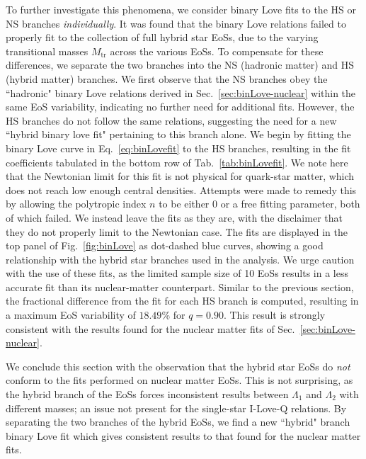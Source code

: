 \documentclass[prd,twocolumn,nofootinbib,superscriptaddress,amsmath,amssymb]{revtex4-1}
\begin{document}
To further investigate this phenomena, we consider binary Love fits to the HS or NS branches \emph{individually}.
It was found that the binary Love relations failed to properly fit to the collection of full hybrid star EoSs, due to the varying transitional masses $M_{\text{tr}}$ across the various EoSs.
To compensate for these differences, we separate the two branches into the NS (hadronic matter) and HS (hybrid matter) branches.
We first observe that the NS branches obey the ``hadronic" binary Love relations derived in Sec.~\ref{sec:binLove-nuclear} within the same EoS variability, indicating no further need for additional fits.
However, the HS branches do not follow the same relations, suggesting the need for a new ``hybrid binary love fit" pertaining to this branch alone.
We begin by fitting the binary Love curve in Eq.~\ref{eq:binLovefit} to the HS branches, resulting in the fit coefficients tabulated in the bottom row of Tab.~\ref{tab:binLovefit}.
We note here that the Newtonian limit for this fit is not physical for quark-star matter, which does not reach low enough central densities.
Attempts were made to remedy this by allowing the polytropic index $n$ to be either $0$ or a free fitting parameter, both of which failed.
We instead leave the fits as they are, with the disclaimer that they do not properly limit to the Newtonian case.
The fits are displayed in the top panel of Fig.~\ref{fig:binLove} as dot-dashed blue curves, showing a good relationship with the hybrid star branches used in the analysis.
We urge caution with the use of these fits, as the limited sample size of 10 EoSs results in a less accurate fit than its nuclear-matter counterpart.
Similar to the previous section, the fractional difference from the fit for each HS branch is computed, resulting in a maximum EoS variability of $18.49$\% for $q=0.90$.
This result is strongly consistent with the results found for the nuclear matter fits of Sec.~\ref{sec:binLove-nuclear}.

We conclude this section with the observation that the hybrid star EoSs do \emph{not} conform to the fits performed on nuclear matter EoSs.
This is not surprising, as the hybrid branch of the EoSs forces inconsistent results between $\Lambda_1$ and $\Lambda_2$ with different masses; an issue not present for the single-star I-Love-Q relations.
By separating the two branches of the hybrid EoSs, we find a new ``hybrid" branch binary Love fit which gives consistent results to that found for the nuclear matter fits. 

\end{document}
